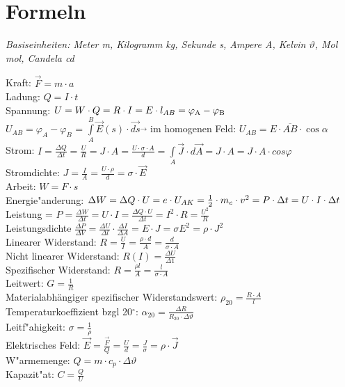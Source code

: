 \section{Formeln}

\textit{Basiseinheiten: Meter m, Kilogramm kg, Sekunde s, Ampere A, Kelvin $\vartheta$, Mol mol, Candela cd} \\
\begin{minipage}{12cm}
	Kraft: $\overrightarrow{F} = m \cdot a$ \\ 
	Ladung: $Q = I \cdot t$\\
	Spannung: $U = W \cdot Q = R \cdot I = E \cdot l_{AB} = \varphi \textsubscript{A} - \varphi \textsubscript{B}$\\
	$ U_{AB} = \varphi_A - \varphi_B $ = $\int\limits_{A}^B \vec E (s) \cdot  \vec{ds} \overrightarrow{}$ im homogenen Feld: $U_{AB} = E \cdot \overline{AB} \cdot \cos\alpha $ \\
	Strom: $I = \frac{\Delta Q}{\Delta t} = \frac{U}{R} = J \cdot A = \frac{U \cdot \sigma \cdot A}{d} = \int\limits_{A} \vec J \cdot d\vec A = J \cdot A = J \cdot A \cdot cos \varphi $\\
	Stromdichte: $J=\frac {I}{A} = \frac{U \cdot \rho}{d} = \sigma \cdot \vec E $\\
	Arbeit: $W = F \cdot s$ \\
	Energie"anderung: $\Delta W = \Delta Q \cdot U = e \cdot U_{AK} = \frac{1}{2} \cdot m_{e}  \cdot v^2 = \\ P \cdot \Delta t = U \cdot I \cdot \Delta t$ \\
	Leistung = $P = \frac{\Delta W}{\Delta t}= U \cdot I = \frac{\Delta Q \cdot U}{\Delta t} = I^2 \cdot R = \frac{U^2}{R} $\hspace{10pt}\\
	Leistungsdichte $\frac{\Delta P}{\Delta V} = \frac{\Delta U }{\Delta l} \cdot \frac{\Delta I}{\Delta A} = E \cdot J = \sigma E^2 = \rho \cdot J^2 $\\
	Linearer Widerstand: $R = \frac{U}{I} = \frac{\rho \cdot d}{A} = \frac{d}{\sigma \cdot A} \; $\\
	Nicht linearer Widerstand: $R(I) = \frac{\Delta U}{\Delta 1}$ \\
	Spezifischer Widerstand: $R = \frac{\rho\mathit{l}}{A}=\frac{\mathit{l}}{\sigma \cdot A}$\\
	Leitwert: $G = \frac{1}{R}$ \\
	Materialabhängiger spezifischer Widerstandswert: $\rho_{20} = \frac{R \cdot A}{l} $\\
	Temperaturkoeffizient bzgl 20$^\circ$: $\alpha_{20}=\frac{\Delta R}{ R_{20} \cdot \Delta \vartheta}$ \\
	Leitf"ahigkeit: $\sigma = \frac{1}{\rho}$ \\
	Elektrisches Feld: $\overrightarrow{E} = \frac{\overrightarrow{F}}{Q} = \frac{U}{d} = \frac{J}{\sigma} = \rho \cdot \vec J $\\
	W"armemenge: $Q = m \cdot c_{p} \cdot \Delta\vartheta$ \\
	Kapazit"at: $C = \frac{Q}{U}$

\end{minipage}
